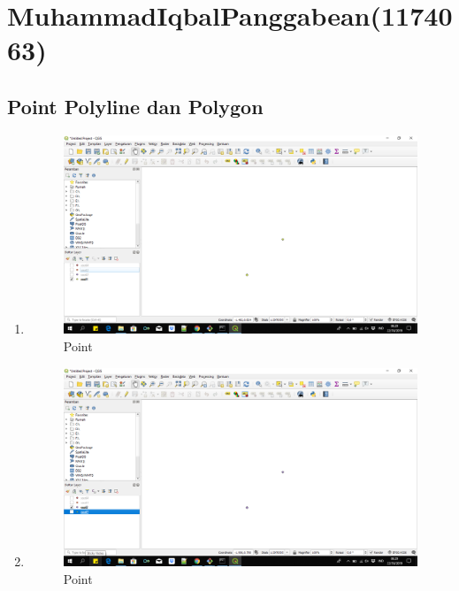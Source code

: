 \section{MuhammadIqbalPanggabean(1174063)}
\subsection{Point Polyline dan Polygon}
\begin{enumerate}
	\item 
	
	\begin{figure}[H]
		\includegraphics[width=12cm]{figures/1174063/1.PNG}
		\centering
		\caption{Point}
	\end{figure}
	
	\item 
	
	\begin{figure}[H]
		\includegraphics[width=12cm]{figures/1174063/2.PNG}
		\centering
		\caption{Point}
	\end{figure}
	

\end{enumerate}
